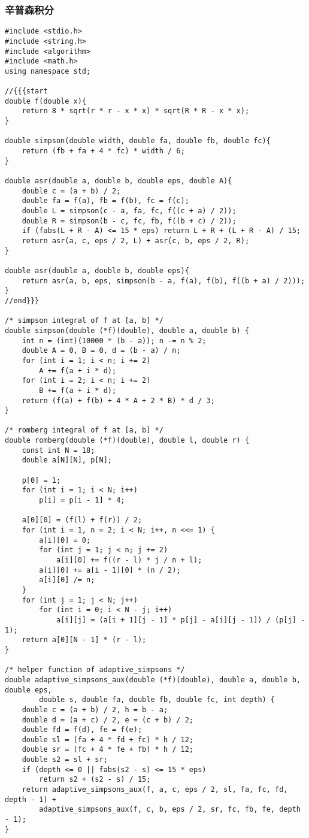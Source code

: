 \subsubsection{辛普森积分}
\begin{verbatim}
#include <stdio.h>
#include <string.h>
#include <algorithm>
#include <math.h>
using namespace std;

//{{{start
double f(double x){
	return 8 * sqrt(r * r - x * x) * sqrt(R * R - x * x);
}

double simpson(double width, double fa, double fb, double fc){
	return (fb + fa + 4 * fc) * width / 6;
}

double asr(double a, double b, double eps, double A){
	double c = (a + b) / 2;
	double fa = f(a), fb = f(b), fc = f(c);
	double L = simpson(c - a, fa, fc, f((c + a) / 2));
	double R = simpson(b - c, fc, fb, f((b + c) / 2));
	if (fabs(L + R - A) <= 15 * eps) return L + R + (L + R - A) / 15;
	return asr(a, c, eps / 2, L) + asr(c, b, eps / 2, R);
}

double asr(double a, double b, double eps){
	return asr(a, b, eps, simpson(b - a, f(a), f(b), f((b + a) / 2)));
}
//end}}}

/* simpson integral of f at [a, b] */
double simpson(double (*f)(double), double a, double b) {
    int n = (int)(10000 * (b - a)); n -= n % 2;
    double A = 0, B = 0, d = (b - a) / n;
    for (int i = 1; i < n; i += 2)
        A += f(a + i * d);
    for (int i = 2; i < n; i += 2)
        B += f(a + i * d);
    return (f(a) + f(b) + 4 * A + 2 * B) * d / 3;
}

/* romberg integral of f at [a, b] */
double romberg(double (*f)(double), double l, double r) {
    const int N = 18;
    double a[N][N], p[N];

    p[0] = 1;
    for (int i = 1; i < N; i++)
        p[i] = p[i - 1] * 4;

    a[0][0] = (f(l) + f(r)) / 2;
    for (int i = 1, n = 2; i < N; i++, n <<= 1) {
        a[i][0] = 0;
        for (int j = 1; j < n; j += 2)
            a[i][0] += f((r - l) * j / n + l);
        a[i][0] += a[i - 1][0] * (n / 2);
        a[i][0] /= n;
    }
    for (int j = 1; j < N; j++)
        for (int i = 0; i < N - j; i++)
            a[i][j] = (a[i + 1][j - 1] * p[j] - a[i][j - 1]) / (p[j] - 1);
    return a[0][N - 1] * (r - l);
}

/* helper function of adaptive_simpsons */
double adaptive_simpsons_aux(double (*f)(double), double a, double b, double eps,
        double s, double fa, double fb, double fc, int depth) {
    double c = (a + b) / 2, h = b - a;
    double d = (a + c) / 2, e = (c + b) / 2;
    double fd = f(d), fe = f(e);
    double sl = (fa + 4 * fd + fc) * h / 12;
    double sr = (fc + 4 * fe + fb) * h / 12;
    double s2 = sl + sr;
    if (depth <= 0 || fabs(s2 - s) <= 15 * eps)
        return s2 + (s2 - s) / 15;
    return adaptive_simpsons_aux(f, a, c, eps / 2, sl, fa, fc, fd, depth - 1) +
        adaptive_simpsons_aux(f, c, b, eps / 2, sr, fc, fb, fe, depth - 1);
}


\end{verbatim}
